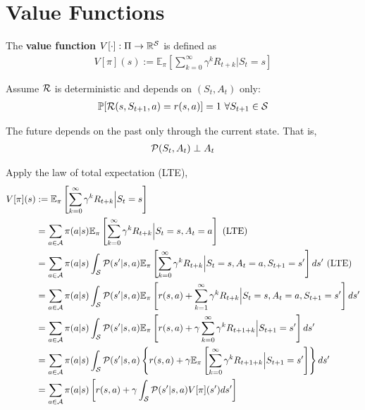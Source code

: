 \documentclass{article}
\begin{document}
	\section{Value Functions}
	\begin{definition}
	The \textbf{value function} $V[\cdot]: \Pi \to \mathbb{R}^{\mathcal{{S}}}$ is defined as
		\begin{align}
			V[\pi](s) := \mathbb{E}_{\pi}\left[\sum_{k=0}^{\infty} \gamma^{k} R_{t+k} | S_{t}=s\right]
		\end{align}
	\end{definition}
	\begin{assumption}
		Assume $\mathcal{{R}}$ is deterministic and depends on $(S_t, A_t)$ only:
		\begin{align}
			\mathbb{P}[{\mathcal{{R}}(s, S_{t+1}, a) = r(s,a)}] = 1\ \forall S_{t+1} \in \mathcal{{S}}
		\end{align}
	\end{assumption}
	\begin{assumption}
		The future depends on the past only through the current state. That is,
		\begin{align}
			\mathcal{{P}}(S_t, A_t) \perp A_t
		\end{align}
	\end{assumption}
	\par Apply the law of total expectation (LTE),
	\begin{align}
		V[\pi](s) &:= \mathbb{E}_{\pi}\left[\sum_{k=0}^{\infty} \gamma^{k} R_{t+k} \Big| S_{t}=s\right] \\
		&= \sum_{a \in \mathcal{{A}}}
		\pi(a|s) \mathbb{E}_\pi \left[
		\sum_{k=0}^{\infty} \gamma^{k} R_{t+k} \Big| S_{t}=s, A_t = a
		\right] \text{{ (LTE)}} \\
		&= \sum_{a \in \mathcal{{A}}}
		\pi(a|s)
		\int_{\mathcal{{S}}}
		\mathcal{{P}}(s'|s, a)
		\mathbb{E}_\pi
		\left[ \sum_{k=0}^{\infty} \gamma^{k} R_{t+k} \Big| S_{t}=s, A_t = a, S_{t+1} = s' \right]
		ds' \text{{ (LTE)}} \\
		&= \sum_{a \in \mathcal{{A}}}
		\pi(a|s)
		\int_{\mathcal{{S}}}
		\mathcal{{P}}(s'|s, a)
		\mathbb{E}_\pi
		\left[r(s, a) + \sum_{k=1}^{\infty} \gamma^{k} R_{t+k} \Big| S_{t}=s, A_t = a, S_{t+1} = s' \right]
		ds' \\
		&= \sum_{a \in \mathcal{{A}}}
		\pi(a|s)
		\int_{\mathcal{{S}}}
		\mathcal{{P}}(s'|s, a)
		\mathbb{E}_\pi
		\left[r(s, a) + \gamma \sum_{k=0}^{\infty} \gamma^{k} R_{t+1+k} \Big|S_{t+1} = s' \right]
		ds' \\
		&= \sum_{a \in \mathcal{{A}}}
		\pi(a|s)
		\int_{\mathcal{{S}}}
		\mathcal{{P}}(s'|s, a)
		\left \{ r(s, a) +
		\gamma \mathbb{E}_\pi
		\left[ \sum_{k=0}^{\infty} \gamma^{k} R_{t+1+k} \Big|S_{t+1} = s' \right] \right \}
		ds' \\
		&= \sum_{a \in \mathcal{{A}}}
		\pi(a|s) \left[
		r(s, a) + 
		\gamma  \int_{\mathcal{{S}}}
		\mathcal{{P}}(s'|s, a)
		V[\pi](s')
		ds' \right ]
	\end{align}
	
\end{document}
